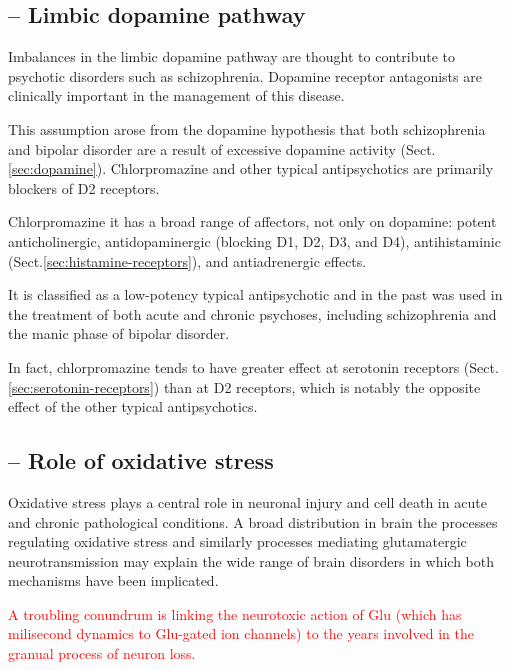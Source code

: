 \subsection{ -- Limbic dopamine pathway}
\label{sec:schizophrenia-hypothesis-dopamine-role}
\label{sec:chlorpromazine}

Imbalances in the limbic dopamine pathway are thought to contribute to psychotic
disorders such as schizophrenia. Dopamine receptor antagonists are clinically
important in the management of this disease.

This assumption arose from the dopamine hypothesis that both schizophrenia and
bipolar disorder are a result of excessive dopamine activity
(Sect.\ref{sec:dopamine}).
Chlorpromazine and other typical antipsychotics are primarily blockers of D2 receptors.

\begin{mdframed}

Chlorpromazine it has a broad range of affectors, not only on dopamine:
potent anticholinergic, antidopaminergic (blocking D1, D2, D3, and D4),
antihistaminic (Sect.\ref{sec:histamine-receptors}), and antiadrenergic effects.

It is classified as a low-potency typical antipsychotic and in the past was used
in the treatment of both acute and chronic psychoses, including schizophrenia
and the manic phase of bipolar disorder.

In fact, chlorpromazine tends to have greater effect at serotonin receptors
(Sect.\ref{sec:serotonin-receptors}) than at D2 receptors, which is notably the
opposite effect of the other typical antipsychotics.

\end{mdframed}

\subsection{ -- Role of oxidative stress}
\label{sec:schizophrenia-hypothesis-oxidative-stress-role}
\label{sec:oxidative-stress}

Oxidative stress plays a central role in neuronal injury and cell death in acute
and chronic pathological conditions.
A broad distribution in brain the processes regulating oxidative stress and
similarly processes mediating glutamatergic neurotransmission may explain the
wide range of brain disorders in which both mechanisms have been implicated.

\textcolor{red}{A troubling conundrum is linking the neurotoxic action of Glu
(which has milisecond dynamics to Glu-gated ion channels) to the years involved in the
granual process of neuron loss.}


